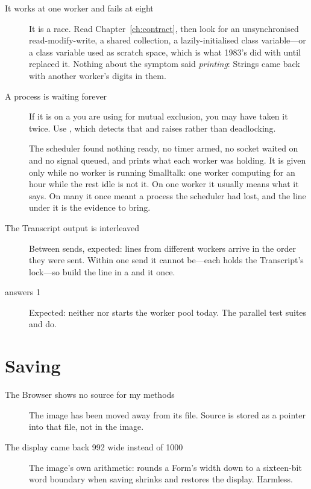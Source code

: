 \begin{description}
\item[It works at one worker and fails at eight] It is a race. Read
  Chapter~\ref{ch:contract}, then look for an unsynchronised
  read-modify-write, a shared collection, a lazily-initialised class
  variable---or a class variable used as scratch space, which is what 1983's
   did with  until
   replaced it. Nothing about the symptom said
  \emph{printing}: Strings came back with another worker's digits in them.
\item[A process is waiting forever] If it is on a  you are using
  for mutual exclusion, you may have taken it twice. Use , which
  detects that and raises rather than deadlocking.
\item[] The scheduler found
  nothing ready, no timer armed, no socket waited on and no signal queued,
  and prints what each worker was holding. It is given only while no worker
  is running Smalltalk: one worker computing for an hour while the rest idle
  is not it. On one worker it usually means what it says. On many it once
  meant a process the scheduler had lost, and the line under it is the
  evidence to bring.
\item[The Transcript output is interleaved] Between sends, expected: lines
  from different workers arrive in the order they were sent. Within one
  send it cannot be---each  holds the Transcript's lock---so build
  the line in a  and  it once.
\item[ answers 1] Expected: neither
   nor  starts the worker pool today. The
  parallel test suites and  do.
\end{description}

\section{Saving}

\begin{description}
\item[The Browser shows no source for my methods] The image has been moved
  away from its  file. Source is stored as a pointer into that
  file, not in the image.
\item[The display came back 992 wide instead of 1000] The image's own
  arithmetic:  rounds a Form's width down to a sixteen-bit
  word boundary when saving shrinks and restores the display. Harmless.
\end{description}

